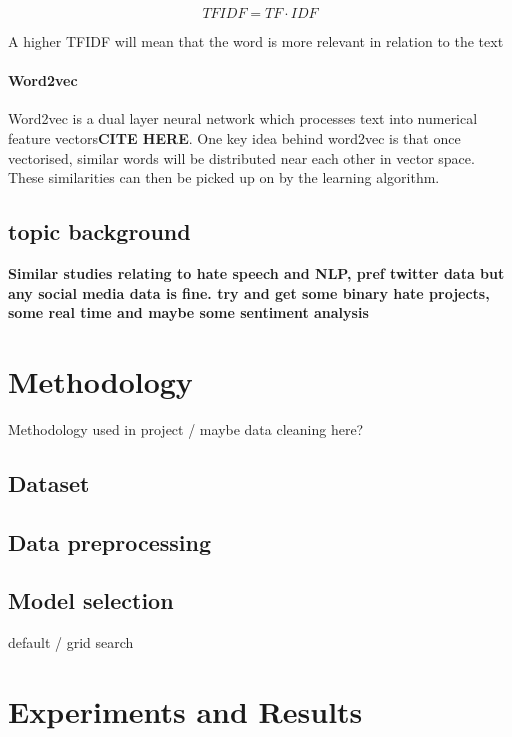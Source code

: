 \documentclass[conference]{IEEEtran}
\begin{document}
\[ TFIDF = TF \cdot IDF \]

A higher TFIDF will mean that the word is more relevant in relation to the text\\

\paragraph{\textbf{Word2vec}}
Word2vec is a dual layer neural network which processes text into numerical feature vectors\textbf{CITE HERE}. One key idea behind word2vec is that once vectorised, similar words will be distributed near each other in vector space. These similarities can then be picked up on by the learning algorithm. 

\subsection{topic background}
\textbf{Similar studies relating to hate speech and NLP, pref twitter data but any social media data is fine.
try and get some binary hate projects, some real time and maybe some sentiment analysis}

\section{Methodology}
Methodology used in project / maybe data cleaning here?

\subsection{Dataset}

\subsection{Data preprocessing}

\subsection{Model selection}\label{AA}
default / grid search

\section{Experiments and Results}
\end{document}
